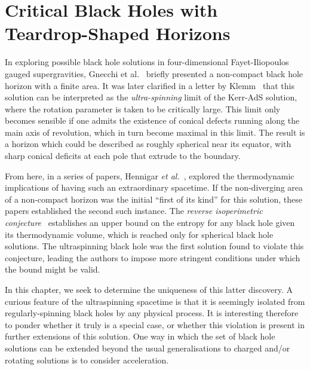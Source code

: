 \documentclass[
twoside,
openright,
frontopenright
]{dmathesis}
\begin{document}
\chapter{Critical Black Holes with Teardrop-Shaped Horizons}
\label{chap:crit-bh}

In exploring possible black hole solutions in four-dimensional Fayet-Iliopoulos
gauged supergravities, Gnecchi et al.~\cite{Gnecchi:2013mja} briefly presented a
non-compact black hole horizon with a finite area. It was later clarified in a
letter by Klemm~\cite{Klemm:2014rda} that this solution can be interpreted as
the \emph{ultra-spinning} limit of the Kerr-AdS solution, where the rotation
parameter is taken to be critically large. This limit only becomes sensible if
one admits the existence of conical defects running along the main axis of
revolution, which in turn become maximal in this limit. The result is a horizon
which could be described as roughly spherical near its equator, with sharp
conical deficits at each pole that extrude to the boundary.

From here, in a series of papers, Hennigar \emph{et
  al.}~\cite{Hennigar:2015gan,Hennigar:2014cfa,Hennigar:2015cja}, explored the
thermodynamic implications of having such an extraordinary spacetime. If the
non-diverging area of a non-compact horizon was the initial ``first of its
kind'' for this solution, these papers established the second such instance. The
\emph{reverse isoperimetric conjecture}~\cite{Dolan:2013ft,Cvetic:2010jb}
establishes an upper bound on the entropy for any black hole given its
thermodynamic volume, which is reached only for spherical black hole
solutions. The ultraspinning black hole was the first solution found to violate
this conjecture, leading the authors to impose more stringent conditions under
which the bound might be valid.

In this chapter, we seek to determine the uniqueness of this latter discovery. A
curious feature of the ultraspinning spacetime is that it is seemingly isolated
from regularly-spinning black holes by any physical process. It is interesting
therefore to ponder whether it truly is a special case, or whether this
violation is present in further extensions of this solution. One way in which
the set of black hole solutions can be extended beyond the usual generalisations
to charged and/or rotating solutions is to consider acceleration.
\end{document}
